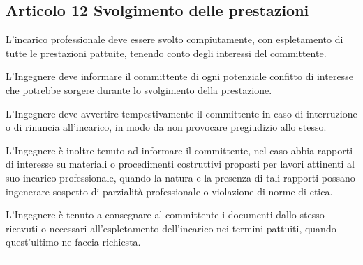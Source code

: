 \documentclass[letterpaper,10pt,italian]{sphinxmanual}
\begin{document}
\subsection{Articolo 12 \sphinxhyphen{} Svolgimento delle prestazioni}
\label{\detokenize{capitoli/codice/codice_deontologico:articolo-12-svolgimento-delle-prestazioni}}\begin{description}
\sphinxAtStartPar
L’incarico professionale deve essere svolto compiutamente, con espletamento di tutte le prestazioni pattuite, tenendo conto degli interessi del committente.

\sphinxAtStartPar
L’Ingegnere deve informare il committente di ogni potenziale confitto di interesse che potrebbe sorgere durante lo svolgimento della prestazione.

\sphinxAtStartPar
L’Ingegnere deve avvertire tempestivamente il committente in caso di interruzione o di rinuncia all’incarico, in modo da non provocare pregiudizio allo stesso.

\sphinxAtStartPar
L’Ingegnere è inoltre tenuto ad informare il committente, nel caso abbia rapporti di interesse su materiali o procedimenti costruttivi proposti per lavori attinenti al suo incarico professionale, quando la natura e la presenza di tali rapporti possano ingenerare sospetto di parzialità professionale o violazione di norme di etica.

\sphinxAtStartPar
L’Ingegnere è tenuto a consegnare al committente i documenti dallo stesso ricevuti o necessari all’espletamento dell’incarico nei termini pattuiti, quando quest’ultimo ne faccia richiesta.

\end{description}


\bigskip\hrule\bigskip



\section{}
\label{\detokenize{capitoli/codice/codice_deontologico:capo-iii-rapporti-interni}}
\end{document}
